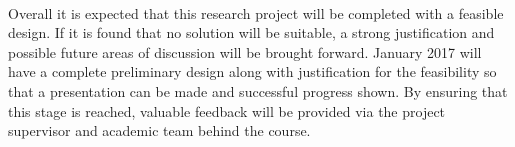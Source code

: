 \paragraph{}
Overall it is expected that this research project will be completed with a feasible design. If it is found that no solution will be suitable, a strong justification and possible future areas of discussion will be brought forward. January 2017 will have a complete preliminary design along with justification for the feasibility so that a presentation can be made and successful progress shown. By ensuring that this stage is reached, valuable feedback will be provided via the project supervisor and academic team behind the course. 
\newpage